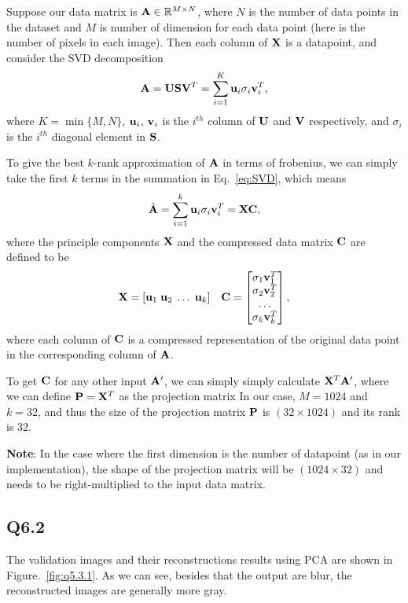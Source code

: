 \documentclass[11pt]{article}
\begin{document}
Suppose our data matrix is $\mathbf{A} \in \mathbb{R}^{M\times N}$, where $N$ is the number of data points in the dataset and $M$ is number of dimension for each data point (here is the number of pixels in each image). Then each column of $\mathbf{X}$ is a datapoint, and consider the SVD decomposition
\begin{align} \label{eq:SVD}
  \mathbf{A} = \mathbf{U}\mathbf{S}\mathbf{V}^T  = \sum_{i=1}^K \mathbf{u}_i \sigma_i \mathbf{v}_i^T,
\end{align}
where $K=\min\{M, N\}$, $\mathbf{u}_i$, $\mathbf{v}_i$ is the $i^{th}$ column of $\mathbf{U}$ and $\mathbf{V}$ respectively,
and $\sigma_i$ is the $i^{th}$ diagonal element in $\mathbf{S}$.

To give the best $k$-rank approximation of $\mathbf{A}$ in terms of frobenius, we can simply take the first $k$ terms in the summation in Eq.~\ref{eq:SVD}, which means
\begin{align}
  \hat{\mathbf{A}} = \sum_{i=1}^k \mathbf{u}_i \sigma_i \mathbf{v}_i^T = \mathbf{X} \mathbf{C},
\end{align}
where the principle components $\mathbf{X}$ and the compressed data matrix $\mathbf{C}$ are defined to be
\begin{align}
  \mathbf{X} = [ \mathbf{u}_1\;\mathbf{u}_2\;\dots\;\mathbf{u}_k ] \quad
  \mathbf{C} =
  \begin{bmatrix}
    \sigma_1\mathbf{v}_1^T \\ \sigma_2\mathbf{v}_2^T \\ \dots \\ \sigma_k\mathbf{v}_k^T
  \end{bmatrix},
\end{align}
where each column of $\mathbf{C}$ is a compressed representation of the original data point in the corresponding column of $\mathbf{A}$.

To get $\mathbf{C}$ for any other input $\mathbf{A}'$, we can simply simply calculate $\mathbf{X}^T\mathbf{A}'$, where we can define $\mathbf{P} = \mathbf{X}^T$ as the projection matrix
In our case, $M=1024$ and $k=32$, and thus the size of the projection matrix $\mathbf{P}$ is $(32 \times 1024)$ and its rank is 32.

\textbf{Note}: In the case where the first dimension is the number of datapoint (as in our implementation), the shape of the projection matrix will be $(1024 \times 32)$ and needs to be right-multiplied to the input data matrix.

\newpage

\subsection*{Q6.2}

The validation images and their reconstructions results using PCA are shown in Figure.~\ref{fig:q5.3.1}. As we can see, besides that the output are blur, the reconstructed images are generally more gray.
\end{document}
